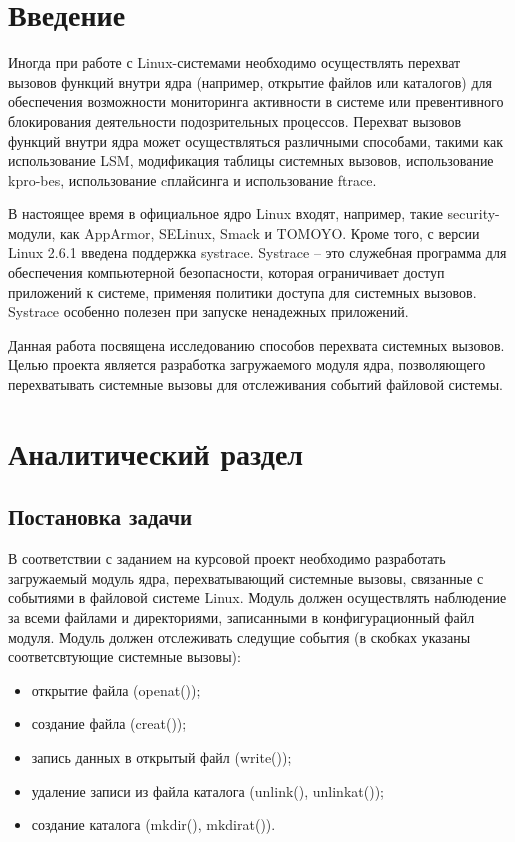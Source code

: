 \documentclass[a4paper,14pt]{article}
\begin{document}
\setcounter{page}{2}
\tableofcontents

\newpage
\section*{Введение}

Иногда при работе с Linux-системами необходимо осуществлять перехват вызовов функций внутри ядра (например, открытие файлов или каталогов) для обеспечения возможности мониторинга активности в системе или превентивного блоки­рования деятельности подозрительных процессов.
Перехват вызовов функций внутри ядра может осуществляться различными способами, такими как использование LSM, модификация таблицы системных вызовов, использование kpro-bes, использование cплайсинга и использование ftrace.

В настоящее время в официальное ядро Linux входят, например, такие security-модули, как AppArmor, SELinux, Smack и TOMOYO. Кроме того, с версии Linux 2.6.1 введена поддержка systrace. Systrace -- это служебная программа для обеспечения компьютерной безопасности, которая ограничивает доступ приложений к системе, применяя политики доступа для системных вызовов. Systrace особенно полезен при запуске ненадежных приложений.

Данная работа посвящена исследованию способов перехвата системных вызовов. Целью проекта является разработка загружаемого модуля ядра, позволяющего перехватывать системные вызовы для отслеживания событий файловой системы.


\newpage
\section{Аналитический раздел}

\subsection{Постановка задачи}

В соответствии с заданием на курсовой проект необходимо разработать загружаемый модуль ядра, перехватывающий системные вызовы, связанные с событиями в файловой системе Linux. Модуль должен осуществлять наблюдение за всеми файлами и директориями, записанными в конфигурационный файл модуля. Модуль должен отслеживать следущие события (в скобках указаны соответсвтующие системные вызовы):

\begin{itemize}
	\item открытие файла (openat());
	\item создание файла (creat());
	\item запись данных в открытый файл (write()); 
	\item удаление записи из файла каталога (unlink(), unlinkat());
	\item создание каталога (mkdir(), mkdirat()).
\end{itemize}
\end{document}
